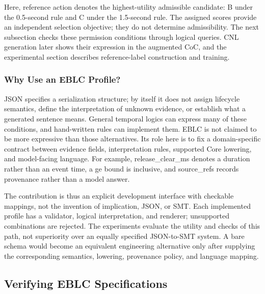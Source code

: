 \documentclass[nolineno]{ieeeaccess}
\begin{document}
Here, {\ttfamily{}\selectfont\footnotesize reference action} denotes the highest-utility admissible candidate: B under the 0.5-second rule and C under the 1.5-second rule. The assigned scores provide an independent selection objective; they do not determine admissibility. The next subsection checks these permission conditions through logical queries. CNL generation later shows their expression in the augmented CoC, and the experimental section describes reference-label construction and training.\par

\subsubsection{Why Use an EBLC Profile?}

JSON specifies a serialization structure; by itself it does not assign lifecycle semantics, define the interpretation of unknown evidence, or establish what a generated sentence means. General temporal logics can express many of these conditions, and hand-written rules can implement them. EBLC is not claimed to be more expressive than those alternatives. Its role here is to fix a domain-specific contract between evidence fields, interpretation rules, supported Core lowering, and model-facing language. For example, {\ttfamily{}\selectfont\footnotesize release\_\allowbreak clear\_\allowbreak ms} denotes a duration rather than an event time, a {\ttfamily{}\selectfont\footnotesize ge} bound is inclusive, and {\ttfamily{}\selectfont\footnotesize source\_\allowbreak refs} records provenance rather than a model answer.\par

The contribution is thus an explicit development interface with checkable mappings, not the invention of implication, JSON, or SMT. Each implemented profile has a validator, logical interpretation, and renderer; unsupported combinations are rejected. The experiments evaluate the utility and checks of this path, not superiority over an equally specified JSON-to-SMT system. A bare schema would become an equivalent engineering alternative only after supplying the corresponding semantics, lowering, provenance policy, and language mapping.\par


\subsection{Verifying EBLC Specifications}\label{sec:verification}
\end{document}
